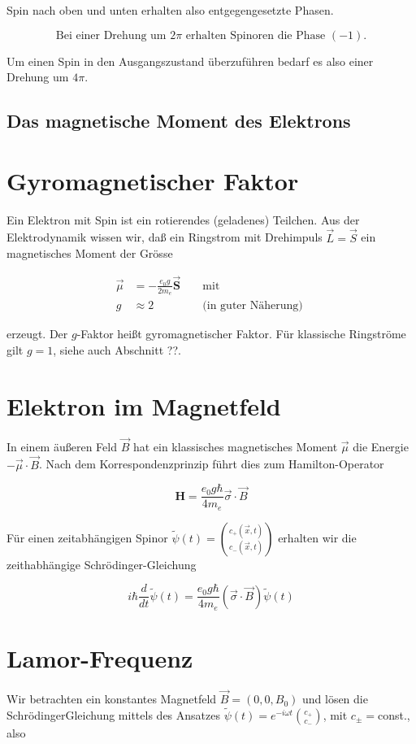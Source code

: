 \documentclass[10pt, letterpaper]{article}
\begin{document}
Spin nach oben und unten erhalten also entgegengesetzte Phasen.

$$
\text { Bei einer Drehung um } 2 \pi \text { erhalten Spinoren die Phase }(-1) \text {. }
$$

Um einen Spin in den Ausgangszustand überzuführen bedarf es also einer Drehung um $4 \pi$.

\subsection*{Das magnetische Moment des Elektrons}
\section*{Gyromagnetischer Faktor}
Ein Elektron mit Spin ist ein rotierendes (geladenes) Teilchen. Aus der Elektrodynamik wissen wir, daß ein Ringstrom mit Drehimpuls $\vec{L}=\vec{S}$ ein magnetisches Moment der Grösse

$$
\begin{aligned}
\vec{\mu} & =-\frac{e_{0} g}{2 m_{e}} \overrightarrow{\mathbf{S}} & & \text { mit } \\
g & \approx 2 & & \text { (in guter Näherung) }
\end{aligned}
$$

erzeugt. Der $g$-Faktor heißt gyromagnetischer Faktor. Für klassische Ringströme gilt $g=1$, siehe auch Abschnitt ??.

\section*{Elektron im Magnetfeld}
In einem äußeren Feld $\vec{B}$ hat ein klassisches magnetisches Moment $\vec{\mu}$ die Energie $-\vec{\mu} \cdot \vec{B}$. Nach dem Korrespondenzprinzip führt dies zum Hamilton-Operator

$$
\mathbf{H}=\frac{e_{0} g \hbar}{4 m_{e}} \vec{\sigma} \cdot \vec{B}
$$

Für einen zeitabhängigen Spinor $\tilde{\psi}(t)=\binom{c_{+}(\vec{x}, t)}{c_{-}(\vec{x}, t)}$ erhalten wir die zeithabhängige Schrödinger-Gleichung

$$
i \hbar \frac{d}{d t} \tilde{\psi}(t)=\frac{e_{0} g \hbar}{4 m_{e}}(\vec{\sigma} \cdot \vec{B}) \tilde{\psi}(t)
$$

\section*{Lamor-Frequenz}
Wir betrachten ein konstantes Magnetfeld $\vec{B}=\left(0,0, B_{0}\right)$ und lösen die SchrödingerGleichung mittels des Ansatzes $\tilde{\psi}(t)=e^{-i \omega t}\binom{c_{+}}{c_{-}}$, mit $c_{ \pm}=$const., also
\end{document}
